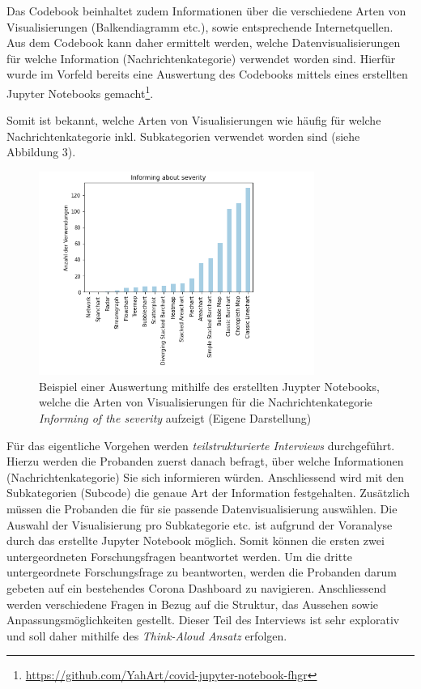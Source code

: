\documentclass[12pt, oneside]{article}
\begin{document}
Das Codebook beinhaltet zudem Informationen über die verschiedene Arten von Visualisierungen (Balkendiagramm etc.), sowie entsprechende Internetquellen. Aus dem Codebook kann daher ermittelt werden, welche Datenvisualisierungen für welche Information (Nachrichtenkategorie) verwendet worden sind. Hierfür wurde im Vorfeld bereits eine Auswertung des Codebooks mittels eines erstellten Jupyter Notebooks gemacht\footnote{\url{https://github.com/YahArt/covid-jupyter-notebook-fhgr}}.

\clearpage
Somit ist bekannt, welche Arten von Visualisierungen wie häufig für welche Nachrichtenkategorie inkl. Subkategorien verwendet worden sind (siehe Abbildung 3).


\begin{figure}[ht]
    \includegraphics[width=9cm]{images/visualization_types_for_magnitude_spread.png}
    \centering
    \caption{Beispiel einer Auswertung mithilfe des erstellten Juypter Notebooks, welche die Arten von Visualisierungen für die Nachrichtenkategorie \textit{Informing of the severity} aufzeigt (Eigene Darstellung)}
\end{figure}

Für das eigentliche Vorgehen werden \textit{teilstrukturierte Interviews} durchgeführt. Hierzu werden die Probanden zuerst danach befragt, über welche Informationen (Nachrichtenkategorie) Sie sich informieren würden. Anschliessend wird mit den Subkategorien (Subcode) die genaue Art der Information festgehalten. Zusätzlich müssen die Probanden die für sie passende Datenvisualisierung auswählen. Die Auswahl der Visualisierung pro Subkategorie etc. ist aufgrund der Voranalyse durch das erstellte Jupyter Notebook möglich. Somit können die ersten zwei untergeordneten Forschungsfragen beantwortet werden. Um die dritte untergeordnete Forschungsfrage zu beantworten, werden die Probanden darum gebeten auf ein bestehendes Corona Dashboard zu navigieren. Anschliessend werden verschiedene Fragen in Bezug auf die Struktur, das Aussehen sowie Anpassungsmöglichkeiten gestellt. Dieser Teil des Interviews ist sehr explorativ und soll daher mithilfe des \textit{Think-Aloud Ansatz} erfolgen.
\end{document}
